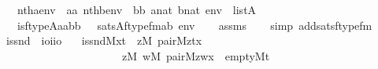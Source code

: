 \begin{isabellebody}
\ \ \ \ {\isachardoublequoteopen}nth{\isacharparenleft}{\kern0pt}a{\isacharcomma}{\kern0pt}env{\isacharparenright}{\kern0pt}\ {\isacharequal}{\kern0pt}\ aa{\isachardoublequoteclose}\ {\isachardoublequoteopen}nth{\isacharparenleft}{\kern0pt}b{\isacharcomma}{\kern0pt}env{\isacharparenright}{\kern0pt}\ {\isacharequal}{\kern0pt}\ bb{\isachardoublequoteclose}\ {\isachardoublequoteopen}a{\isasymin}nat{\isachardoublequoteclose}\ {\isachardoublequoteopen}b{\isasymin}nat{\isachardoublequoteclose}\ {\isachardoublequoteopen}env\ {\isasymin}\ list{\isacharparenleft}{\kern0pt}A{\isacharparenright}{\kern0pt}{\isachardoublequoteclose}\isanewline
\ \ \isanewline
\ \ \ \ {\isachardoublequoteopen}is{\isacharunderscore}{\kern0pt}ftype{\isacharparenleft}{\kern0pt}{\isacharhash}{\kern0pt}{\isacharhash}{\kern0pt}A{\isacharcomma}{\kern0pt}aa{\isacharcomma}{\kern0pt}bb{\isacharparenright}{\kern0pt}\ \ {\isasymlongleftrightarrow}\ sats{\isacharparenleft}{\kern0pt}A{\isacharcomma}{\kern0pt}ftype{\isacharunderscore}{\kern0pt}fm{\isacharparenleft}{\kern0pt}a{\isacharcomma}{\kern0pt}b{\isacharparenright}{\kern0pt}{\isacharcomma}{\kern0pt}\ env{\isacharparenright}{\kern0pt}{\isachardoublequoteclose}\isanewline
%
\isadelimproof
\ \ %
\endisadelimproof
%
\isatagproof
{}\isamarkupfalse%
\ assms\isanewline
\ \ \isamarkupfalse%
\ {\isacharparenleft}{\kern0pt}simp\ add{\isacharcolon}{\kern0pt}sats{\isacharunderscore}{\kern0pt}ftype{\isacharunderscore}{\kern0pt}fm{\isacharparenright}{\kern0pt}%
\endisatagproof
{\isafoldproof}%
%
\isadelimproof
\isanewline
%
\endisadelimproof
\isanewline
{}\isamarkupfalse%
\isanewline
\ \ is{\isacharunderscore}{\kern0pt}snd\ {\isacharcolon}{\kern0pt}{\isacharcolon}{\kern0pt}\ {\isachardoublequoteopen}{\isacharparenleft}{\kern0pt}i{\isasymRightarrow}o{\isacharparenright}{\kern0pt}{\isasymRightarrow}i{\isasymRightarrow}i{\isasymRightarrow}o{\isachardoublequoteclose}\ \isanewline
\ \ {\isachardoublequoteopen}is{\isacharunderscore}{\kern0pt}snd{\isacharparenleft}{\kern0pt}M{\isacharcomma}{\kern0pt}x{\isacharcomma}{\kern0pt}t{\isacharparenright}{\kern0pt}\ {\isasymequiv}\ {\isacharparenleft}{\kern0pt}{\isasymexists}z{\isacharbrackleft}{\kern0pt}M{\isacharbrackright}{\kern0pt}{\isachardot}{\kern0pt}\ pair{\isacharparenleft}{\kern0pt}M{\isacharcomma}{\kern0pt}z{\isacharcomma}{\kern0pt}t{\isacharcomma}{\kern0pt}x{\isacharparenright}{\kern0pt}{\isacharparenright}{\kern0pt}\ {\isasymor}\ \isanewline
\ \ \ \ \ \ \ \ \ \ \ \ \ \ \ \ \ \ \ \ \ \ \ {\isacharparenleft}{\kern0pt}{\isasymnot}{\isacharparenleft}{\kern0pt}{\isasymexists}z{\isacharbrackleft}{\kern0pt}M{\isacharbrackright}{\kern0pt}{\isachardot}{\kern0pt}\ {\isasymexists}w{\isacharbrackleft}{\kern0pt}M{\isacharbrackright}{\kern0pt}{\isachardot}{\kern0pt}\ pair{\isacharparenleft}{\kern0pt}M{\isacharcomma}{\kern0pt}z{\isacharcomma}{\kern0pt}w{\isacharcomma}{\kern0pt}x{\isacharparenright}{\kern0pt}{\isacharparenright}{\kern0pt}\ {\isasymand}\ empty{\isacharparenleft}{\kern0pt}M{\isacharcomma}{\kern0pt}t{\isacharparenright}{\kern0pt}{\isacharparenright}{\kern0pt}{\isachardoublequoteclose}\isanewline

\end{isabellebody}

